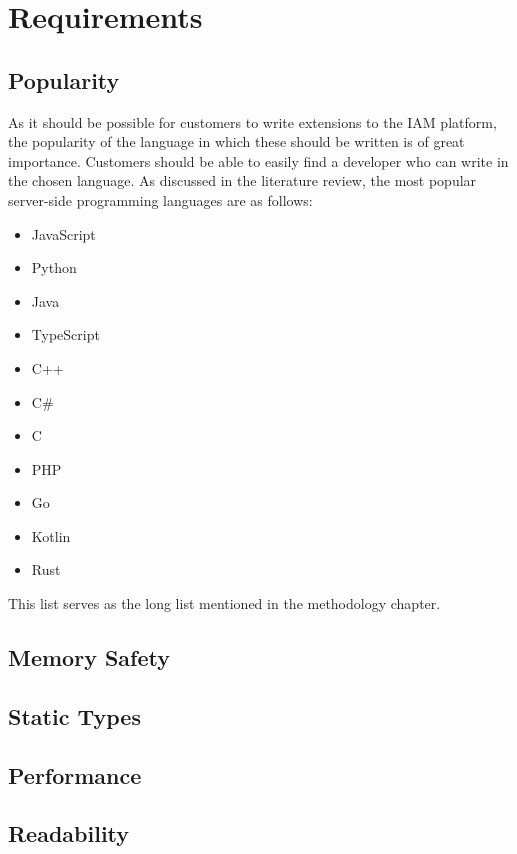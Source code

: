 \chapter{Requirements}
\label{ch:requirements}

\section{Popularity}
As it should be possible for customers to write extensions to the IAM platform, the popularity of the language in which these should be written is of great importance. Customers should be able to easily find a developer who can write in the chosen language. As discussed in the literature review, the most popular server-side programming languages are as follows:
\begin{itemize}
    \item JavaScript
    \item Python
    \item Java
    \item TypeScript
    \item C++
    \item C\#
    \item C
    \item PHP
    \item Go
    \item Kotlin
    \item Rust
\end{itemize}

This list serves as the long list mentioned in the methodology chapter.

\section{Memory Safety}
\section{Static Types}

\section{Performance}

\section{Readability}

